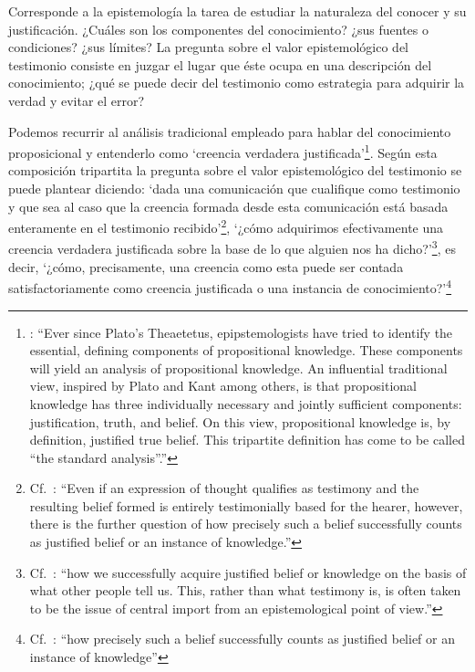 Corresponde a la epistemología la tarea de estudiar la naturaleza del conocer y su justificación. ¿Cuáles son los componentes del conocimiento? ¿sus fuentes o condiciones? ¿sus límites? La pregunta sobre el valor epistemológico del testimonio consiste en juzgar el lugar que éste ocupa en una descripción del conocimiento; ¿qué se puede decir del testimonio como estrategia para adquirir la verdad y evitar el error?

Podemos recurrir al análisis tradicional empleado para hablar del conocimiento proposicional y entenderlo como \enquote*{creencia verdadera justificada}\footnote{\cite[4]{moser2002ep}: \enquote{Ever since Plato's Theaetetus, epipstemologists have tried to identify the essential, defining components of propositional knowledge. These components will yield an analysis of propositional knowledge. An influential traditional view, inspired by Plato and Kant among others, is that propositional knowledge has three individually necessary and jointly sufficient components: justification, truth, and belief. On this view, propositional knowledge is, by definition, justified true belief. This tripartite definition has come to be called ``the standard analysis''.}}. Según esta composición tripartita la pregunta sobre el valor epistemológico del testimonio se puede plantear diciendo: \enquote*{dada una comunicación que cualifique como testimonio y que sea al caso que la creencia formada desde esta comunicación está basada enteramente en el testimonio recibido}\footnote{Cf.~\cite[4]{lackeysosa2006eptest}: \enquote{Even if an expression of thought qualifies as testimony and the resulting belief formed is entirely testimonially based for the hearer, however, there is the further question of how precisely such a belief successfully counts as justified belief or an instance of knowledge.}}, \enquote*{¿cómo adquirimos efectivamente una creencia verdadera justificada sobre la base de lo que alguien nos ha dicho?}\footnote{Cf.~\cite[2]{lackeysosa2006eptest}: \enquote{how we successfully acquire justified belief or knowledge on the basis of what other people tell us. This, rather than what testimony is, is often taken to be the issue of central import from an epistemological point of view.}}, es decir, \enquote*{¿cómo, precisamente, una creencia como esta puede ser contada satisfactoriamente como creencia justificada o una instancia de conocimiento?}\footnote{Cf.~\cite[4]{lackeysosa2006eptest}: \enquote{how precisely such a belief successfully counts as justified belief or an instance of knowledge}}

